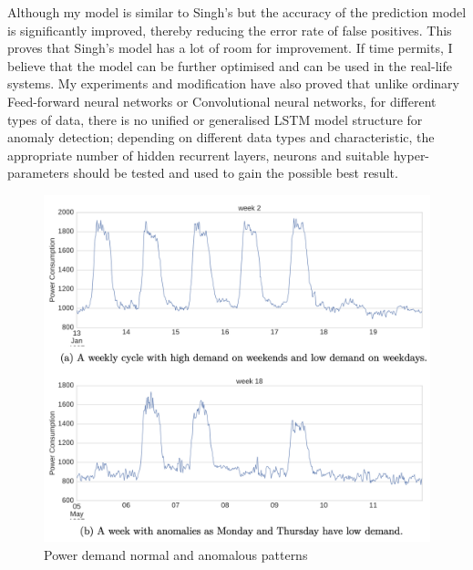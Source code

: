 \documentclass{article}
\begin{document}
Although my model is similar to Singh's but the accuracy of the prediction
model is significantly improved, thereby reducing the error rate of false
positives. This proves that Singh's model has a lot of room for improvement. If
time permits, I believe that the model can be further optimised and can be used
in the real-life systems. My experiments and modification have also proved that
unlike ordinary Feed-forward neural networks or Convolutional neural networks,
for different types of data, there is no unified or generalised LSTM model
structure for anomaly detection; depending on different data types and
characteristic, the appropriate number of hidden recurrent layers, neurons and
suitable hyper-parameters should be tested and used to gain the possible best
result.



\clearpage

\begin{figure}[htb]
	    \centering
\includegraphics[scale=0.45]{png/powerdemand.png}
    \caption{Power demand normal and anomalous patterns
\cite{7-lstmthisis} }
    \label{fig:powerdemand}
\end{figure}
\end{document}
